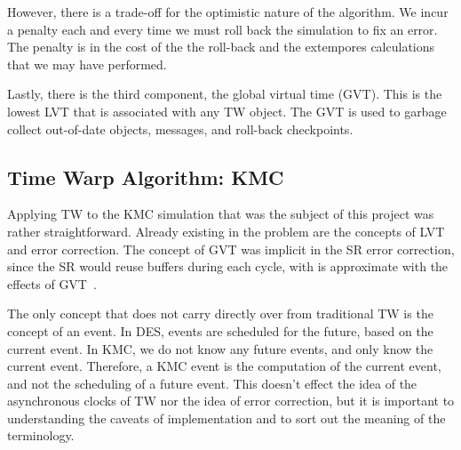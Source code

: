 However, there is a trade-off for the optimistic nature of the algorithm.  We incur a penalty each and every time we must roll back the simulation to fix an error.  The penalty is in the cost of the the roll-back and the extempores calculations that we may have performed.

Lastly, there is the third component, the global virtual time (GVT).  This is the lowest LVT that is associated with any TW object.  The GVT is used to garbage collect out-of-date objects, messages, and roll-back checkpoints.

\subsection{Time Warp Algorithm: KMC}

Applying TW to the KMC simulation that was the subject of this project was rather straightforward.  Already existing in the problem are the concepts of LVT and error correction.  The concept of GVT was implicit in the SR error correction, since the SR would reuse buffers during each cycle, with is approximate with the effects of GVT~\cite{ysja:sr}.

The only concept that does not carry directly over from traditional TW is the concept of an event.  In DES, events are scheduled for the future, based on the current event.  In KMC, we do not know any future events, and only know the current event.  Therefore, a KMC event is the computation of the current event, and not the scheduling of a future event.  This doesn't effect the idea of the asynchronous clocks of TW nor the idea of error correction, but it is important to understanding the caveats of implementation and to sort out the meaning of the terminology.

